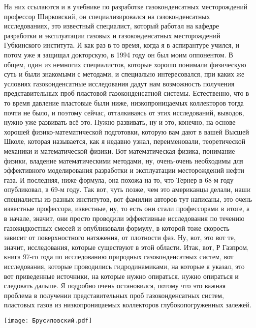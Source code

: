 \documentclass[main.tex]{subfiles}
\begin{document}
На них ссылаются и в учебнике по разработке газоконденсатных месторождений профессор Ширковский, он специализировался на газоконденсатных исследованиях, это известный специалист, который работал на кафедре разработки и эксплуатации газовых и газоконденсатных месторождений Губкинского института.
И как раз в то время, когда я в аспирантуре учился, и потом уже я защищал докторскую, в 1994 году он был моим оппонентом.
В общем, один из немногих специалистов, которые хорошо понимали физическую суть и были знакомыми с методами, и специально интересовался, при каких же условиях газоконденсатные исследования дадут нам возможность получения представительных проб пластовой газоконденсатной системы.
Естественно, что в то время давление пластовые были ниже, низкопроницаемых коллекторов тогда почти не было, и поэтому сейчас, отталкиваясь от этих исследований, выводов, нужно уже развивать всё это.
Нужно развивать, ну и это, конечно, на основе хорошей физико-математической подготовки, которую вам дают в вашей Высшей Школе, которая называется, как я недавно узнал, переименовали, теоретической механики и математической физики.
Вот математическая физика, понимание физики, владение математическими методами, ну, очень-очень необходимы для эффективного моделирования разработки и эксплуатации месторождений нефти газа.
И последняя, ниже формула, она похожа на то, что Тернер в 68-м году опубликовал, в 69-м году.
Так вот, чуть позже, чем это американцы делали, наши специалисты из разных институтов, вот фамилии авторов тут написаны, это очень известные профессора, известные, ну, то есть они стали профессорами в итоге, а в начале, значит, они просто проводили эффективные исследования по течению газожидкостных смесей и опубликовали формулу, в которой тоже скорость зависит от поверхностного натяжения, от плотности фаз.
Ну, вот, это вот те, значит, исследования, которые существуют в этой области.
Итак, вот, Р Газпром, книга 97-го года по исследованию природных газоконденсатных систем, вот исследования, которые проводились гидродинамиками, на которые я указал, это вот приведенные источники, на которые нужно опираться, нужно опираться и следовать дальше.
Я подробно очень остановился, потому что это важная проблема в получении представительных проб газоконденсатных систем, пластовых газов из низкопроницаемых коллекторов глубокопогруженных залежей.

\begin{center}
\texttt{[image: Брусиловский.pdf]}
\end{center}
\end{document}
